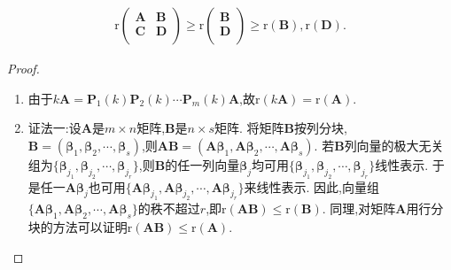 \documentclass[../../main.tex]{subfiles}%
\begin{document}
\begin{proposition}[矩阵秩的基本公式]
\begin{enumerate}[(1)]
\begin{gather*}
\\
\mathrm{r}\left( \begin{matrix}
\boldsymbol{A}&		\boldsymbol{B}\\
\boldsymbol{C}&		\boldsymbol{D}\\
\end{matrix} \right) \geqslant \mathrm{r}\left( \begin{array}{c}
\boldsymbol{B}\\
\boldsymbol{D}\\
\end{array} \right) \geqslant \mathrm{r}\left( \boldsymbol{B} \right) ,\mathrm{r}\left( \boldsymbol{D} \right) .
\end{gather*}
\end{enumerate}
\end{proposition}
\begin{proof}
\begin{enumerate}[(1)]
\item 由于\(k\boldsymbol{A}=\boldsymbol{P}_1(k)\boldsymbol{P}_2(k)\cdots\boldsymbol{P}_m(k)\boldsymbol{A}\),故\(\mathrm{r}(k\boldsymbol{A})=\mathrm{r}(\boldsymbol{A})\).

\item  {\color{blue}证法一:}设\(\boldsymbol{A}\)是\(m\times n\)矩阵,\(\boldsymbol{B}\)是\(n\times s\)矩阵. 将矩阵\(\boldsymbol{B}\)按列分块,\(\boldsymbol{B}=(\boldsymbol{\beta}_1,\boldsymbol{\beta}_2,\cdots,\boldsymbol{\beta}_s)\),则\(\boldsymbol{A}\boldsymbol{B}=(\boldsymbol{A}\boldsymbol{\beta}_1,\boldsymbol{A}\boldsymbol{\beta}_2,\cdots,\boldsymbol{A}\boldsymbol{\beta}_s)\). 若\(\boldsymbol{B}\)列向量的极大无关组为\(\{\boldsymbol{\beta}_{j_1},\boldsymbol{\beta}_{j_2},\cdots,\boldsymbol{\beta}_{j_r}\}\),则\(\boldsymbol{B}\)的任一列向量\(\boldsymbol{\beta}_j\)均可用\(\{\boldsymbol{\beta}_{j_1},\boldsymbol{\beta}_{j_2},\cdots,\boldsymbol{\beta}_{j_r}\}\)线性表示. 于是任一\(\boldsymbol{A}\boldsymbol{\beta}_j\)也可用\(\{\boldsymbol{A}\boldsymbol{\beta}_{j_1},\boldsymbol{A}\boldsymbol{\beta}_{j_2},\cdots,\boldsymbol{A}\boldsymbol{\beta}_{j_r}\}\)来线性表示. 因此,向量组\(\{\boldsymbol{A}\boldsymbol{\beta}_1,\boldsymbol{A}\boldsymbol{\beta}_2,\cdots,\boldsymbol{A}\boldsymbol{\beta}_s\}\)的秩不超过\(r\),即\(\mathrm{r}(\boldsymbol{A}\boldsymbol{B})\leqslant \mathrm{r}(\boldsymbol{B})\). 同理,对矩阵\(\boldsymbol{A}\)用行分块的方法可以证明\(\mathrm{r}(\boldsymbol{A}\boldsymbol{B})\leqslant \mathrm{r}(\boldsymbol{A})\).


\end{enumerate}
\end{proof}
\end{document}

